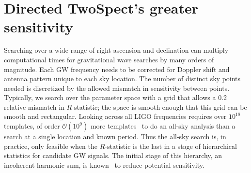

\section{Directed TwoSpect's greater sensitivity}

Searching over a wide range of right ascension and declination
can multiply computational times for gravitational wave searches by many orders of magnitude.
Each GW frequency needs to be corrected for Doppler shift and antenna pattern unique to each sky location.
The number of distinct sky points needed is discretized by the allowed mismatch in sensitivity between points.
Typically, we search over the parameter space with a grid that allows a $0.2$ relative mismatch in $R$ statistic; the space is smooth enough that this grid can be smooth and rectangular.
Looking across all LIGO frequencies requires over $10^{18}$ templates, of order $\mathcal{O}(10^9)$ more templates~\cite{GoetzTwoSpectMethods2011} to do an all-sky analysis than a search at a single location and known period.
Thus the all-sky search is, in practice, only feasible when the $R$-statistic is the last in a stage of hierarchical statistics for candidate GW signals.
The initial stage of this hierarchy, an incoherent harmonic sum, is known~\cite{GoetzTwoSpectMethods2011} to reduce potential sensitivity.

